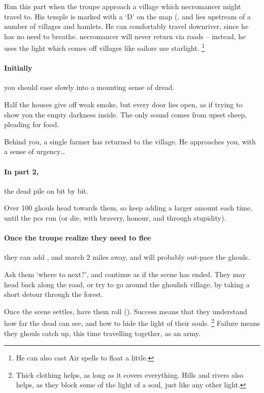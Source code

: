 Run this part when the troupe approach a \gls{village} which \gls{necromancer} might travel to.
His temple is marked with a `\gls{D}' on the map (, and lies upstream of a number of \glspl{village} and hamlets.
He can comfortably travel downriver, since he has no need to breathe.%
\Gls{necromancer} will never return via roads -- instead, he uses the light which comes off \glspl{village} like sailors use starlight.
\footnote{He can also cast Air spells to float a little.}

\paragraph{Initially}
you should ease slowly into a mounting sense of dread.

\begin{boxtext}
  Half the houses give off weak smoke, but every door lies open, as if trying to show you the empty darkness inside.
  The only sound comes from upset sheep, pleading for food.

  Behind you, a single farmer has returned to the \gls{village}.
  He approaches you, with a sense of urgency\ldots
\end{boxtext}


\paragraph{In part 2,}
the dead pile on bit by bit.



Over 100 ghouls head towards them, so keep adding a larger amount each time, until the \glspl{pc} run (or die, with bravery, honour, and through stupidity).

\paragraph{Once the troupe realize they need to flee}
they can add , and march 2 miles away, and will probably out-pace the ghouls.

Ask them `where to next?', and continue as if the scene has ended.
They may head back along the road, or try to go around the ghoulish \gls{village}, by taking a short detour through the forest.

Once the scene settles, have them roll  (\tn[12]).
Success means that they understand how far the dead can see, and how to hide the light of their souls.%
\footnote{Thick clothing helps, as long as it covers everything. Hills and rivers also helps, as they block some of the light of a soul, just like any other light.}
Failure means they ghouls catch up, this time travelling together, as an army.

